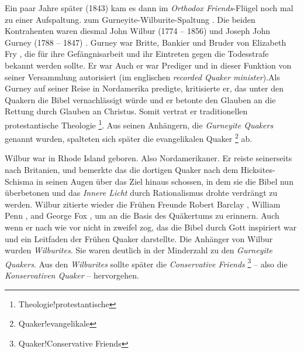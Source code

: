 Ein paar Jahre später (1843) kam es dann im \textit{Orthodox Friends}-Flügel
noch mal zu einer Aufspaltung. zum Gurneyite-Wilburite-Spaltung . Die beiden
Kontrahenten waren diesmal John Wilbur (1774 -- 1856)  und Joseph John Gurney
(1788 -- 1847) . Gurney war Britte, Bankier  und Bruder von Elizabeth Fry , die für
ihre Gefängnisarbeit  und ihr Eintreten gegen die Todesstrafe  bekannt werden
sollte. Er war Auch er war Prediger  und in dieser Funktion von seiner
Versammlung autorisiert (im englischen \textit{recorded Quaker minister}).Als
Gurney auf seiner Reise in Nordamerika predigte, kritisierte er, das unter den
Quakern die Bibel  vernachlässigt würde und er betonte den Glauben an die
Rettung durch Glauben an Christus. Somit vertrat er traditionellen
protestantische Theologie \footnote{Theologie!protestantische}. Aus seinen Anhängern, die \textit{Gurneyite Quakers}
genannt wurden, spalteten sich später die evangelikalen Quaker \footnote{Quaker!evangelikale} ab.

\medskip

Wilbur war in Rhode Island  geboren. Also Nordamerikaner. Er reiste seinerseits
nach Britanien, und bemerkte das die dortigen Quaker nach dem Hicksites-Schisma
in seinen Augen über das Ziel hinaus schossen, in dem sie die Bibel nun
überbetonen und das \textit{Innere Licht} durch Rationalismus drohte verdrängt
zu werden. Wilbur zitierte wieder die Frühen Freunde Robert Barclay , William
Penn , and George Fox , um an die Basis des Quäkertums zu erinnern. Auch wenn er
nach wie vor nicht in zweifel zog, das die Bibel durch Gott inspiriert war und
ein Leitfaden der Frühen Quaker darstellte. Die Anhänger von Wilbur wurden
\textit{Wilburites}. Sie waren deutlich in der Minderzahl zu den
\textit{Gurneyite Quakers}. Aus den \textit{Wilburites} sollte später die
\textit{Conservative Friends} \footnote{Quaker!Conservative Friends} -- also die \textit{Konservativen Quaker} --
hervorgehen.

\medskip

